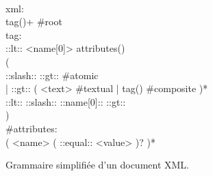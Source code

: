 \begin{figure}

\begin{bigpre}
\\
xml: \\
    tag()+ #root \\
tag: \\
    ::lt:: <name[0]> attributes() \\
    ( \\
      ::slash:: ::gt:: #atomic \\
    | ::gt:: ( <text> #textual | tag() #composite )* \\
      ::lt:: ::slash:: ::name[0]:: ::gt:: \\
    ) \\
#attributes: \\
    ( <name> ( ::equal:: <value> )? )*
\end{bigpre}

\caption{\label{figure:data:xml} Grammaire simplifiée d'un document XML.}

\end{figure}

